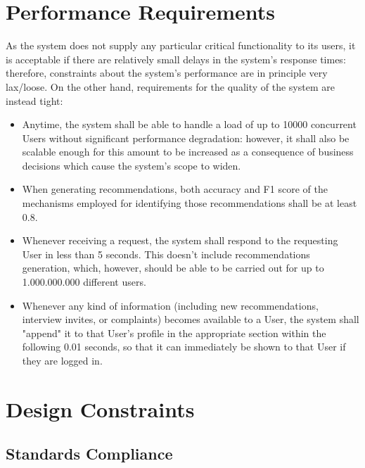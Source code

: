
\section{Performance Requirements}
\label{sec:performance_requirements}

As the system does not supply any particular critical functionality to its users, it is acceptable if there are relatively small delays in the system's response times: therefore, constraints about the system's performance are in principle very lax/loose. On the other hand, requirements for the quality of the system are instead tight:

\begin{itemize}
    \item Anytime, the system shall be able to handle a load of up to 10000 concurrent Users without significant performance degradation: however, it shall also be scalable enough for this amount to be increased as a consequence of business decisions which cause the system's scope to widen.
    \item When generating recommendations, both accuracy and F1 score of the mechanisms employed for identifying those recommendations shall be at least 0.8. 
    \item Whenever receiving a request, the system shall respond to the requesting User in less than 5 seconds. This doesn't include recommendations generation, which, however, should be able to be carried out for up to 1.000.000.000 different users.
    \item Whenever any kind of information (including new recommendations, interview invites, or complaints) becomes available to a User, the system shall "append" it to that User's profile in the appropriate section within the following 0.01 seconds, so that it can immediately be shown to that User if they are logged in.
\end{itemize}

\section{Design Constraints}
\label{sec:design_constraints}%

\subsection{Standards Compliance}
\label{sec:standards_compliance}%

